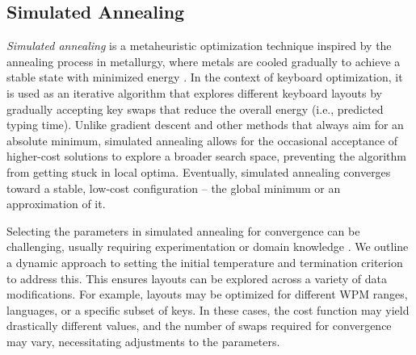
\subsection{Simulated Annealing}


\textit{Simulated annealing} is a metaheuristic optimization technique inspired by the annealing process in metallurgy, where metals are cooled gradually to achieve a stable state with minimized energy \citep{kirkpatrick1983optimization}. In the context of keyboard optimization, it is used as an iterative algorithm that explores different keyboard layouts by gradually accepting key swaps that reduce the overall energy (i.e., predicted typing time). Unlike gradient descent and other methods that always aim for an absolute minimum, simulated annealing allows for the occasional acceptance of higher-cost solutions to explore a broader search space, preventing the algorithm from getting stuck in local optima. Eventually, simulated annealing converges toward a stable, low-cost configuration -- the global minimum or an approximation of it. 



Selecting the parameters in simulated annealing for convergence can be challenging, usually requiring experimentation or domain knowledge \citep{SAOverview}. We outline a dynamic approach to setting the initial temperature and termination criterion to address this. This ensures layouts can be explored across a variety of data modifications. For example, layouts may be optimized for different WPM ranges, languages, or a specific subset of keys. In these cases, the cost function may yield drastically different values, and the number of swaps required for convergence may vary, necessitating adjustments to the parameters.

